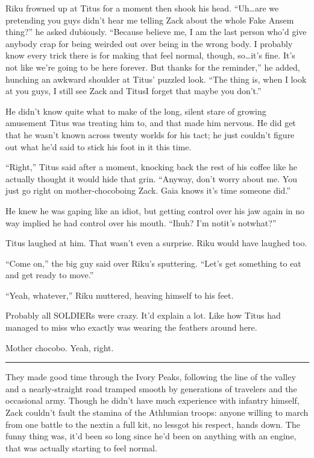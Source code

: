 Riku frowned up at Titus for a moment then shook his head. ``Uh\ldots are we pretending you guys didn't hear me telling Zack about the whole Fake Ansem thing?'' he asked dubiously. ``Because believe me, I am the last person who'd give anybody crap for being weirded out over being in the wrong body. I probably know every trick there is for making that feel normal, though, so\ldots it's fine. It's not like we're going to be here forever. But thanks for the reminder,'' he added, hunching an awkward shoulder at Titus' puzzled look. ``The thing is, when I look at you guys, I still see Zack and Titus\textemdash I forget that maybe you don't.''

He didn't know quite what to make of the long, silent stare of growing amusement Titus was treating him to, and that made him nervous. He did get that he wasn't known across twenty worlds for his tact; he just couldn't figure out what he'd said to stick his foot in it this time.

``Right,'' Titus said after a moment, knocking back the rest of his coffee like he actually thought it would hide that grin. ``Anyway, don't worry about me. You just go right on mother-chocoboing Zack. Gaia knows it's time someone did.''

He knew he was gaping like an idiot, but getting control over his jaw again in no way implied he had control over his mouth. ``I\textemdash huh? I'm not\textemdash it's not\textemdash what?''

Titus laughed at him. That wasn't even a surprise. Riku would have laughed too.

``Come on,'' the big guy said over Riku's sputtering. ``Let's get something to eat and get ready to move.''

``Yeah, whatever,'' Riku muttered, heaving himself to his feet.

Probably all SOLDIERs were crazy. It'd explain a lot. Like how Titus had managed to miss who exactly was wearing the feathers around here.

Mother chocobo. Yeah, right.

\fancybreak{\pfbreakdisplay}


They made good time through the Ivory Peaks, following the line of the valley and a nearly-straight road tramped smooth by generations of travelers and the occasional army. Though he didn't have much experience with infantry himself, Zack couldn't fault the stamina of the Athlumian troops: anyone willing to march from one battle to the next\textemdash in a full kit, no less\textemdash got his respect, hands down. The funny thing was, it'd been so long since he'd been on anything with an engine, that was actually starting to feel normal.

